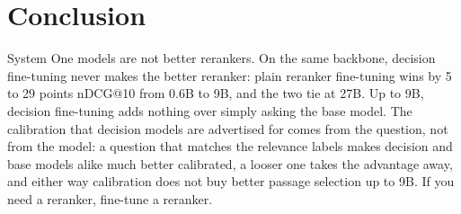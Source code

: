 \section{Conclusion}
\label{sec:conclusion}

System One models are not better rerankers. On the same backbone, decision fine-tuning never makes the better
reranker: plain reranker fine-tuning wins by 5 to 29 points nDCG@10 from 0.6B to 9B, and the two tie at 27B. Up to 9B,
decision fine-tuning adds nothing over simply asking the base model. The calibration that decision models are
advertised for comes from the question, not from the model: a question that matches the relevance labels makes
decision and base models alike much better calibrated, a looser one takes the advantage away, and either way calibration
does not buy better passage selection up to 9B. If you need a reranker, fine-tune a reranker.
